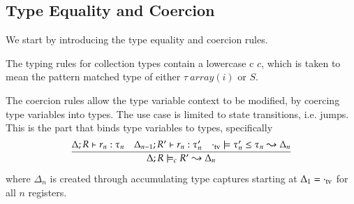 % 
% 
% 
% 
% 
% 

\subsection{Type Equality and Coercion} \label{sec:type-eq-co}
We start by introducing the type equality and coercion rules.

The typing rules for collection types contain a lowercase c $c$, which is
taken to mean the pattern matched type of either $\tau\ array(i)$ or $S$.

The coercion rules allow the type variable context to be modified, by coercing
type variables into types.
The use case is limited to state transitions, i.e. jumps. This is the part that binds type variables to types, specifically
\begin{equation*}
    \infer
        {\Delta; R \models_c R' \leadsto \Delta_n}
        {
            \Delta; R \vdash r_n : \tau_n &
            \Delta_{n - 1}; R' \vdash r_n : \tau'_n &
            \emptytv \models \tau'_n \leq \tau_n \leadsto \Delta_n
        }
\end{equation*}
where $\Delta_n$ is created through accumulating type captures starting at
$\Delta_1 = \cdot_\mathrm{tv}$ for all $n$ registers.

